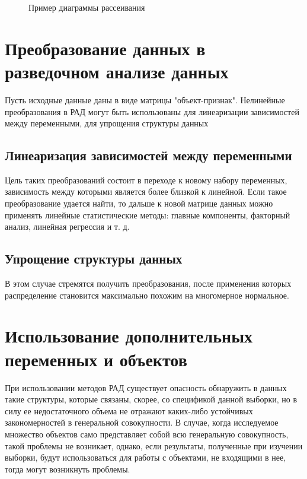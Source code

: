 \documentclass[a4paper, 12pt]{article}
\begin{document}
\begin{figure}[H]
\center{\texttt{[image: dr]}}
\caption{Пример диаграммы рассеивания}
\end{figure}

\section{Преобразование данных  в разведочном анализе данных}

Пусть исходные данные даны в виде матрицы "объект-признак". Нелинейные преобразования в РАД могут быть использованы для линеаризации зависимостей между переменными, для упрощения структуры данных

\subsection{Линеаризация зависимостей между переменными}

Цель таких преобразований состоит в переходе к новому набору переменных, зависимость между которыми является более близкой к линейной. Если такое преобразование удается найти, то дальше к новой матрице данных можно применять линейные статистические методы: главные компоненты, факторный анализ, линейная регрессия и т. д.

\subsection{Упрощение структуры данных}

В этом случае стремятся получить преобразования, после применения которых распределение становится максимально похожим на многомерное нормальное. 

\section{Использование дополнительных переменных и объектов}

При использовании методов РАД существует опасность обнаружить в данных такие структуры, которые связаны, скорее, со спецификой данной выборки, но в силу ее недостаточного объема не отражают каких-либо устойчивых закономерностей в генеральной совокупности. В случае, когда исследуемое множество объектов само представляет собой всю генеральную совокупность, такой проблемы не возникает, однако, если результаты, полученные при изучении выборки, будут использоваться для работы с объектами, не входящими в нее, тогда могут возникнуть проблемы.
\end{document}
